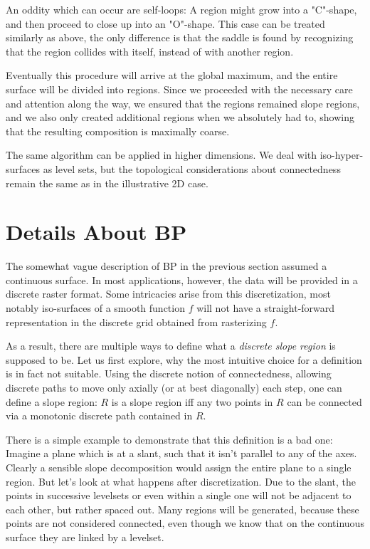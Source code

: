 \documentclass[a4paper,12pt,notitlepage,fullpage]{paper}
\theoremstyle{plain}
\theoremstyle{definition}
\begin{document}
An oddity which can occur are self-loops: A region might grow into a "C"-shape, and then proceed to close up into an "O"-shape. This case can be treated similarly as above, the only difference is that the saddle is found by recognizing that the region collides with itself, instead of with another region.

Eventually this procedure will arrive at the global maximum, and the entire surface will be divided into regions. Since we proceeded with the necessary care and attention along the way, we ensured that the regions remained slope regions, and we also only created additional regions when we absolutely had to, showing that the resulting composition is maximally coarse.

The same algorithm can be applied in higher dimensions. We deal with iso-hyper-surfaces as level sets, but the topological considerations about connectedness remain the same as in the illustrative 2D case.

\section{Details About BP}
\label{sec:details}

The somewhat vague description of BP in the previous section assumed a continuous surface. In most applications, however, the data will be provided in a discrete raster format. Some intricacies arise from this discretization, most notably iso-surfaces of a smooth function $f$ will not have a straight-forward representation in the discrete grid obtained from rasterizing $f$.

As a result, there are multiple ways to define what a \emph{discrete slope region} is supposed to be.
Let us first explore, why the most intuitive choice for a definition is in fact not suitable.
Using the discrete notion of connectedness, allowing discrete paths to move only axially (or at best diagonally) each step, one can define a slope region:
$R$ is a slope region iff any two points in $R$ can be connected via a monotonic discrete path contained in $R$.

There is a simple example to demonstrate that this definition is a bad one: Imagine a plane which is at a slant, such that it isn't parallel to any of the axes. Clearly a sensible slope decomposition would assign the entire plane to a single region.
But let's look at what happens after discretization.
Due to the slant, the points in successive levelsets or even within a single one will not be adjacent to each other, but rather spaced out.
Many regions will be generated, because these points are not considered connected, even though we know that on the continuous surface they are linked by a levelset.
\end{document}
